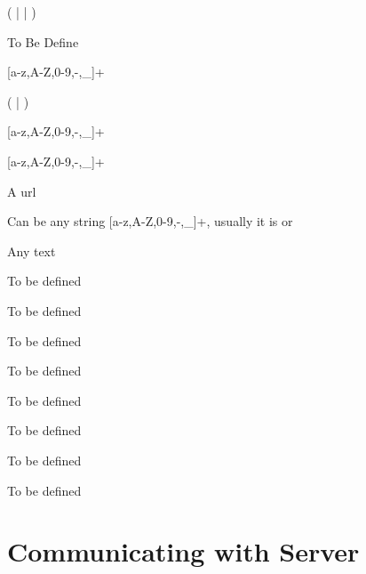 (  |  | )

\bigskip
\noindent
{}

To Be Define

\bigskip
\noindent
{}

[a-z,A-Z,0-9,-,\_]+

\bigskip
\noindent
{}

(  |  )

\bigskip
\noindent
{}

[a-z,A-Z,0-9,-,\_]+

\bigskip
\noindent
{}

[a-z,A-Z,0-9,-,\_]+

\bigskip
\noindent
{}

A url

\bigskip
\noindent
{}

Can be any string [a-z,A-Z,0-9,-,\_]+, usually it is  or 

\bigskip
\noindent
{}

Any text

\bigskip
\noindent
{}

To be defined

\bigskip
\noindent
{}

To be defined

\bigskip
\noindent
{}

To be defined

\bigskip
\noindent
{}

To be defined

\bigskip
\noindent
{}

To be defined

\bigskip
\noindent
{}

To be defined

\bigskip
\noindent
{}

To be defined

\bigskip
\noindent
{}

To be defined

\section{Communicating with \ei Server}
\label{ch:server:protocol}


